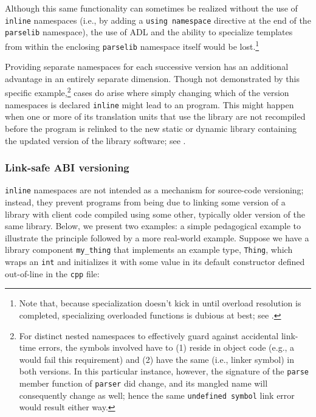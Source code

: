 Although this same functionality can sometimes be realized without the
use of \lstinline!inline! namespaces (i.e., by adding a
\lstinline!using!~\lstinline!namespace! directive at the end of the
\lstinline!parselib! namespace), the use of ADL and the ability to
specialize templates from within the enclosing \lstinline!parselib!
namespace itself would be lost.{\cprotect\footnote{Note that, because
specialization doesn't kick in until overload resolution is completed,
specializing overloaded functions is dubious at best; see .}}

Providing separate namespaces for each successive version has an
additional advantage in an entirely separate dimension. Though not
demonstrated by this specific example,{\cprotect\footnote{For distinct
nested namespaces to effectively guard against accidental link-time
errors, the symbols involved have to (1) reside in object code (e.g.,
a  would fail this requirement) and (2)
have the same  (i.e., linker symbol) in both
versions. In this particular instance, however, the signature of the
\lstinline!parse! member function of \lstinline!parser! did change, and its
mangled name will consequently change as well; hence the same
  \lstinline!undefined!~\lstinline!symbol! link error would result either way.}}
cases do arise where simply changing which of the version namespaces is
declared \lstinline!inline! might lead to an  program. This might happen when one or more of
its translation units that use the library are not recompiled before the
program is relinked to the new static or dynamic library containing the
updated version of the library software; see . 

\subsubsection[Link-safe ABI versioning]{Link-safe ABI versioning}\label{link-safe-abi-versioning}

\lstinline!inline! namespaces are not intended as a mechanism for
source-code versioning; instead, they prevent programs from being
 due to linking some version of a library with client
code compiled using some other, typically older version of the same
library. Below, we present two examples: a simple pedagogical example
to illustrate the principle followed by a more real-world example.
Suppose we have a library component \lstinline!my_thing! that implements
an example type, \lstinline!Thing!, which wraps an \lstinline!int! and
initializes it with some value in its default constructor defined
out-of-line in the \lstinline!cpp! file:

